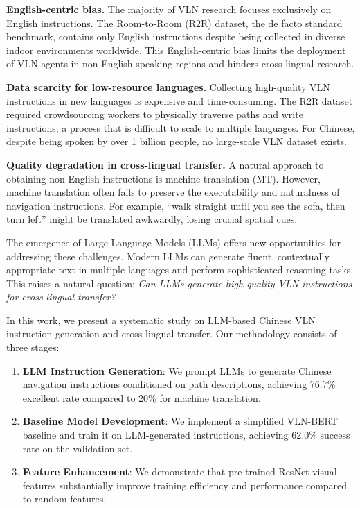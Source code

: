 \documentclass[11pt,a4paper]{article}
\begin{document}
\noindent\textbf{English-centric bias.} The majority of VLN research focuses exclusively on English instructions. The Room-to-Room (R2R) dataset, the de facto standard benchmark, contains only English instructions despite being collected in diverse indoor environments worldwide. This English-centric bias limits the deployment of VLN agents in non-English-speaking regions and hinders cross-lingual research.

\noindent\textbf{Data scarcity for low-resource languages.} Collecting high-quality VLN instructions in new languages is expensive and time-consuming. The R2R dataset required crowdsourcing workers to physically traverse paths and write instructions, a process that is difficult to scale to multiple languages. For Chinese, despite being spoken by over 1 billion people, no large-scale VLN dataset exists.

\noindent\textbf{Quality degradation in cross-lingual transfer.} A natural approach to obtaining non-English instructions is machine translation (MT). However, machine translation often fails to preserve the executability and naturalness of navigation instructions. For example, ``walk straight until you see the sofa, then turn left'' might be translated awkwardly, losing crucial spatial cues.

The emergence of Large Language Models (LLMs) offers new opportunities for addressing these challenges. Modern LLMs can generate fluent, contextually appropriate text in multiple languages and perform sophisticated reasoning tasks. This raises a natural question: \textit{Can LLMs generate high-quality VLN instructions for cross-lingual transfer?}

In this work, we present a systematic study on LLM-based Chinese VLN instruction generation and cross-lingual transfer. Our methodology consists of three stages:

\begin{enumerate}
    \item \textbf{LLM Instruction Generation}: We prompt LLMs to generate Chinese navigation instructions conditioned on path descriptions, achieving 76.7\% excellent rate compared to 20\% for machine translation.
    \item \textbf{Baseline Model Development}: We implement a simplified VLN-BERT baseline and train it on LLM-generated instructions, achieving 62.0\% success rate on the validation set.
    \item \textbf{Feature Enhancement}: We demonstrate that pre-trained ResNet visual features substantially improve training efficiency and performance compared to random features.
\end{enumerate}
\end{document}
